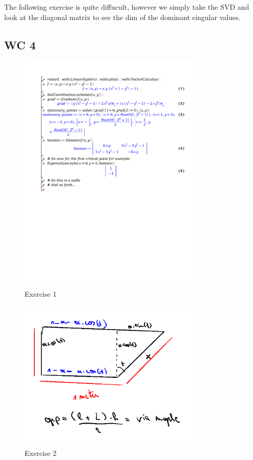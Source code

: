 \documentclass[a4paper]{article}
\begin{document}
The following exercise is quite diffucult, however we simply take the SVD and look at the diagonal matrix to see the dim of the dominant singular values.



\subsection*{WC 4}

\begin{figure}[H]
	\centering
	\includegraphics[width=0.8\textwidth]{exercises/wc_4_ex_1.pdf}
	\caption{Exercise 1}
	\label{fig:word_4_ex_1}
\end{figure}


\begin{figure}[H]
	\centering
	\includegraphics[width=0.8\textwidth]{assets/wc_4_ex_2.png}
	\caption{Exercise 2}
	\label{fig:wc_4_ex_2}
\end{figure}
\end{document}
